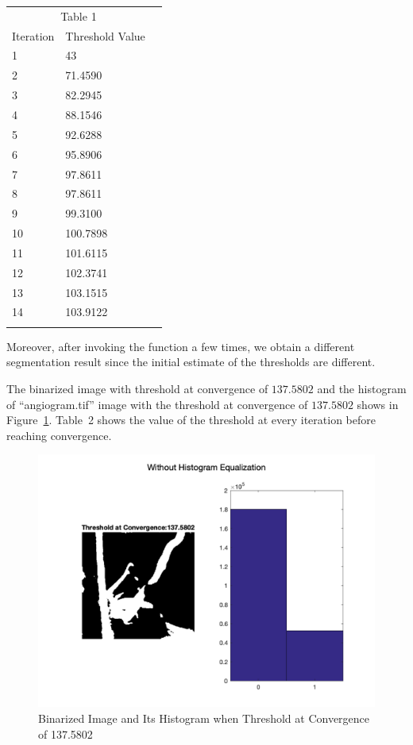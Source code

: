 \documentclass[12pt, letter]{article}
\begin{document}
\begin{center}
\begin{tabular}{llr}  
\toprule
\multicolumn{2}{c}{Table 1} \\
\cmidrule(r){1-2}
Iteration   & Threshold Value \\
\midrule
1      & 43 \\
2 & 71.4590 \\
3  & 82.2945 \\
4     & 88.1546 \\
5 & 92.6288 \\
6 & 95.8906 \\
7 & 97.8611 \\
8 & 97.8611 \\
9 & 99.3100 \\
10 & 100.7898 \\
11 & 101.6115 \\
12 & 102.3741 \\
13 & 103.1515 \\
14 & 103.9122 \\
\bottomrule
\label{table:q2-1}
\end{tabular}    
\end{center}

Moreover, after invoking the function a few times, we obtain a different segmentation result since the initial estimate of the thresholds are different. 

The binarized image with threshold at convergence of $\mathbf{137.5802}$ and the histogram of ``angiogram.tif'' image with the threshold at convergence of $\mathbf{137.5802}$ shows in Figure~\ref{fig:q2-2}. Table~2 shows the value of the threshold at every iteration before reaching convergence.

\begin{figure}
    \centering
    \includegraphics[width=14cm]{q2-2.png}
    \caption{Binarized Image and Its Histogram when Threshold at Convergence of 137.5802}
    \label{fig:q2-2}
\end{figure}
\end{document}
